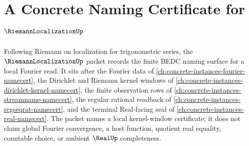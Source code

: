 \chapter{A Concrete Naming Certificate for $\RiemannLocalizationUp$}
\label{ch:concrete-instances-riemann-localization-namecert}

Following Riemann on localization for trigonometric series, the $\RiemannLocalizationUp$ packet records the finite BEDC naming surface for a local Fourier read. It sits after the Fourier data of \autoref{ch:concrete-instances-fourier-namecert}, the Dirichlet and Riemann kernel windows of \autoref{ch:concrete-instances-dirichlet-kernel-namecert}, the finite observation rows of \autoref{ch:concrete-instances-streamname-namecert}, the regular rational readback of \autoref{ch:concrete-instances-regseqrat-namecert}, and the terminal Real-facing seal of \autoref{ch:concrete-instances-real-namecert}. The packet names a local kernel-window certificate; it does not claim global Fourier convergence, a host function, quotient real equality, countable choice, or ambient $\RealUp$ completeness.

